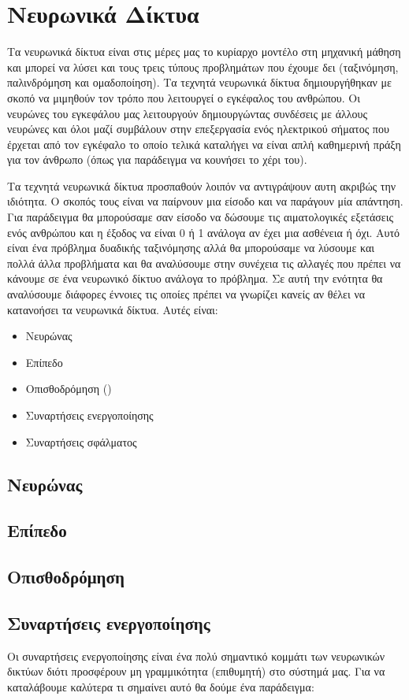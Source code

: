 \newpage
\section{Νευρωνικά Δίκτυα}
Τα νευρωνικά δίκτυα είναι στις μέρες μας το κυρίαρχο μοντέλο στη μηχανική μάθηση και μπορεί να λύσει και τους τρεις τύπους προβλημάτων που έχουμε δει (ταξινόμηση, παλινδρόμηση και ομαδοποίηση). Τα τεχνητά νευρωνικά δίκτυα δημιουργήθηκαν με
σκοπό να μιμηθούν τον τρόπο που λειτουργεί ο εγκέφαλος του ανθρώπου. Οι νευρώνες του εγκεφάλου μας λειτουργούν δημιουργώντας συνδέσεις με άλλους νευρώνες και όλοι μαζί συμβάλουν στην επεξεργασία ενός ηλεκτρικού σήματος που έρχεται από τον
εγκέφαλο το οποίο τελικά καταλήγει να είναι απλή καθημερινή πράξη για τον άνθρωπο (όπως για παράδειγμα να κουνήσει το χέρι του)\cite{nnip}.

Τα τεχνητά νευρωνικά δίκτυα προσπαθούν λοιπόν να αντιγράψουν αυτη ακριβώς την ιδιότητα. Ο σκοπός τους είναι να παίρνουν μια είσοδο και να παράγουν μία απάντηση. Για παράδειγμα θα μπορούσαμε σαν είσοδο να δώσουμε τις αιματολογικές εξετάσεις
ενός ανθρώπου και η έξοδος να είναι 0 ή 1 ανάλογα αν έχει μια ασθένεια ή όχι. Αυτό είναι ένα πρόβλημα δυαδικής ταξινόμησης αλλά θα μπορούσαμε να λύσουμε και πολλά άλλα προβλήματα και θα αναλύσουμε στην συνέχεια τις αλλαγές που πρέπει να
κάνουμε σε ένα νευρωνικό δίκτυο ανάλογα το πρόβλημα. Σε αυτή την ενότητα θα αναλύσουμε διάφορες έννοιες τις οποίες πρέπει να γνωρίζει κανείς αν θέλει να κατανοήσει τα νευρωνικά δίκτυα. Αυτές είναι\cite{nnav}:
\begin{itemize}
    \item Νευρώνας
    \item Επίπεδο
    \item Οπισθοδρόμηση ()
    \item Συναρτήσεις ενεργοποίησης
    \item Συναρτήσεις σφάλματος
\end{itemize}

\subsection{Νευρώνας}
\subsection{Επίπεδο}
\subsection{Οπισθοδρόμηση}
\subsection{Συναρτήσεις ενεργοποίησης}
Οι συναρτήσεις ενεργοποίησης είναι ένα πολύ σημαντικό κομμάτι των νευρωνικών δικτύων διότι προσφέρουν μη γραμμικότητα (επιθυμητή) στο σύστημά μας. Για να καταλάβουμε καλύτερα τι σημαίνει αυτό θα δούμε ένα παράδειγμα\cite{nnactmlm}:

